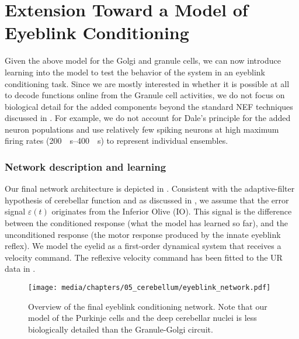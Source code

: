 
\section{Extension Toward a Model of Eyeblink Conditioning}
\label{sec:cerebellum_eyeblink}

Given the above model for the Golgi and granule cells, we can now introduce learning into the model to test the behavior of the system in an eyeblink conditioning task.
Since we are mostly interested in whether it is possible at all to decode functions online from the Granule cell activities, we do not focus on biological detail for the added components beyond the standard NEF techniques discussed in .
For example, we do not account for Dale's principle for the added neuron populations and use relatively few spiking neurons at high maximum firing rates (\SIrange{200}{400}{\per\second}) to represent individual ensembles.

\subsubsection{Network description and learning}
Our final network architecture is depicted in .
Consistent with the adaptive-filter hypothesis of cerebellar function and as discussed in , we assume that the error signal $\varepsilon(t)$ originates from the Inferior Olive (IO).
This signal is the difference between the conditioned response (what the model has learned so far), and the unconditioned response (the motor response produced by the innate eyeblink reflex).
We model the eyelid as a first-order dynamical system that receives a velocity command.
The reflexive velocity command has been fitted to the UR data in \citet{heiney2014cerebellardependent}.

\begin{figure}
	\centering%
	\texttt{[image: media/chapters/05\_cerebellum/eyeblink\_network.pdf]}
	\caption[Overview of the final eyeblink conditioning network]{Overview of the final eyeblink conditioning network. Note that our model of the Purkinje cells and the deep cerebellar nuclei is less biologically detailed than the Granule-Golgi circuit.
	}
	\label{fig:eyeblink_network}
\end{figure}

